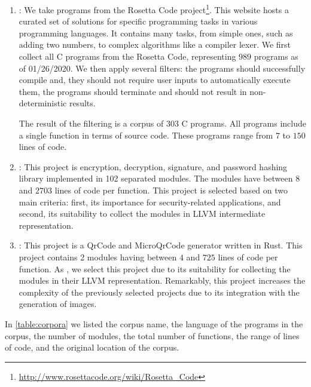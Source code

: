 \begin{enumerate}
    \item \textbf{\corpusrosetta}: We take programs from the Rosetta Code project\footnote{\url{http://www.rosettacode.org/wiki/Rosetta_Code}}. This website hosts a curated set of solutions for specific programming tasks in various programming languages. It contains many tasks, from simple ones, such as adding two numbers, to complex algorithms like a compiler lexer. We first collect all C programs from the Rosetta Code, representing $989$ programs as of 01/26/2020. We then apply several filters: the programs should successfully compile and, they should not require user inputs to automatically execute them, the programs should terminate and should not result in non-deterministic results. 
    
    The result of the filtering is a corpus of 303 C programs. All programs include a single function in terms of source code. These programs range from $7$ to $150$ lines of code.

    \item \textbf{\corpussodium}: This project is encryption, decryption, signature, and password hashing library implemented in 102 separated modules. The modules have between $8$ and $2703$ lines of code per function. This project is selected based on two main criteria: first, its importance for security-related applications, and second, its suitability to collect the modules in LLVM intermediate representation. %

    \item \textbf{\corpusqrcode}: This project is a QrCode and MicroQrCode generator written in Rust. This project contains 2 modules having between $4$ and $725$ lines of code per function. As \corpussodium, we select this project due to its suitability for collecting the modules in their LLVM representation. Remarkably, this project increases the complexity of the previously selected projects due to its integration with the generation of images.
    
\end{enumerate}

In \autoref{table:corpora} we listed the corpus name, the language of the programs in the corpus, the number of modules, the total number of functions, the range of lines of code, and the original location of the corpus. 



